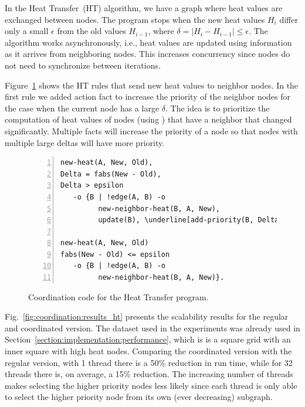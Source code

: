 In the Heat Transfer~(HT) algorithm, we have a graph where heat values are
exchanged between nodes. The program stops when the new heat values $H_i$
differ only a small $\epsilon$ from the old values $H_{i-1}$, where $\delta =
|H_i - H_{i-1}| \le \epsilon$. The algorithm works asynchronously, i.e., heat
values are updated using information as it arrives from neighboring nodes. This
increases concurrency since nodes do not need to synchronize between
iterations.

Figure~\ref{code:coord:ht} shows the HT rules that send new heat values to
neighbor nodes. In the first rule we added  action fact to
increase the priority of the neighbor nodes for the case when the current node
has a large $\delta$. The idea is to prioritize the computation of heat values
of nodes (using ) that have a neighbor that changed significantly.
Multiple  facts will increase the priority of a node so that
nodes with multiple large deltas will have more priority.

\begin{figure}[h!]
\begin{Verbatim}[numbers=left,fontsize=\codesize,commandchars=\\\[\]]
new-heat(A, New, Old),
Delta = fabs(New - Old),
Delta > epsilon
   -o {B | !edge(A, B) -o
         new-neighbor-heat(B, A, New),
         update(B), \underline[add-priority(B, Delta)]}.

new-heat(A, New, Old)
fabs(New - Old) <= epsilon
   -o {B | !edge(A, B) -o
         new-neighbor-heat(B, A, New)}.
\end{Verbatim}
  \caption{Coordination code for the Heat Transfer program.}
  \label{code:coord:ht}
\end{figure}

Fig.~\ref{fig:coordination:results_ht} presents the scalability results for the
regular and coordinated version. The dataset used in the experiments was already
used in Section~\ref{section:implementation:performance}, which is is a square
grid with an inner square with high heat nodes. Comparing the coordinated
version with the regular version, with 1 thread there is a 50\% reduction in run
time, while for 32 threads there is, on average, a 15\% reduction. The
increasing number of threads makes selecting the higher priority nodes less
likely since each thread is only able to select the higher priority node from
its own (ever decreasing) subgraph.

